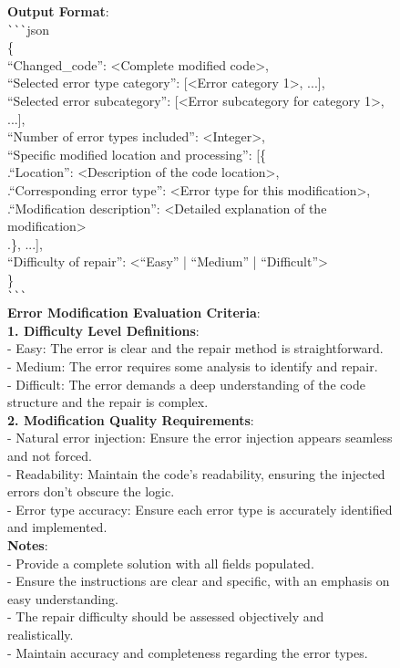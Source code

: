 \documentclass[11pt, a4paper, logo, copyright, nonumbering, amsart]{map}
\begin{document}
\begin{CJK*}{UTF8}{gbsn}
\begin{figure*}[h!]
\begin{center}
\begin{tcolorbox}[width=1\textwidth, colback=lightblue, title={\textbf{Insert Bug Prompt}}]
    \textbf{Output Format}:\\
    \verb|```|json\\
    \{\\
      ``Changed\_code'': <Complete modified code>,\\
      ``Selected error type category'': [<Error category 1>, ...],\\
      ``Selected error subcategory'': [<Error subcategory for category 1>, ...],\\
      ``Number of error types included'': <Integer>,\\
      ``Specific modified location and processing'': [\{\\
          .\quad``Location'': <Description of the code location>,\\
          .\quad``Corresponding error type'': <Error type for this modification>,\\
          .\quad``Modification description'': <Detailed explanation of the modification>\\
        .\quad\}, ...],\\
      ``Difficulty of repair'': <``Easy'' | ``Medium'' | ``Difficult''>\\
    \}\\
    \verb|```|\\
    
    \textbf{Error Modification Evaluation Criteria}:\\
    \textbf{1. Difficulty Level Definitions}:\\
    - Easy: The error is clear and the repair method is straightforward.\\
    - Medium: The error requires some analysis to identify and repair.\\
    - Difficult: The error demands a deep understanding of the code structure and the repair is complex.\\
    \textbf{2. Modification Quality Requirements}:\\
    - Natural error injection: Ensure the error injection appears seamless and not forced.\\
    - Readability: Maintain the code’s readability, ensuring the injected errors don’t obscure the logic.\\
    - Error type accuracy: Ensure each error type is accurately identified and implemented.\\
    
    \textbf{Notes}:\\
    - Provide a complete solution with all fields populated.\\
    - Ensure the instructions are clear and specific, with an emphasis on easy understanding.\\
    - The repair difficulty should be assessed objectively and realistically.\\
    - Maintain accuracy and completeness regarding the error types.\\


\end{tcolorbox}
\end{center}
\end{figure*}
\end{CJK*}
\end{document}
